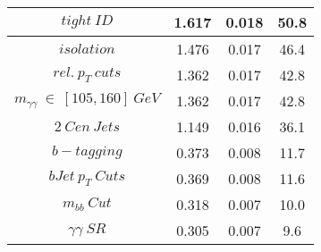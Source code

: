 \begin{table}
\begin{center}
\begin{tabular}{|c|c|c|c|}
 \hline
$tight\ ID$ & 1.617&0.018 &50.8 \\
 \hline
$isolation$ & 1.476&0.017 &46.4 \\
 \hline
$rel.\ p_{T}\ cuts$ & 1.362&0.017 &42.8 \\
 \hline
$m_{\gamma\gamma}\ \in\ [105,160]\ GeV$ & 1.362&0.017 &42.8 \\
 \hline
$2\ Cen\ Jets$ & 1.149&0.016 &36.1 \\
 \hline
$b-tagging$ & 0.373&0.008 &11.7 \\
 \hline
$bJet\ p_{T}\ Cuts$ & 0.369&0.008 &11.6 \\
 \hline
$m_{bb}\ Cut$ & 0.318&0.007 &10.0 \\
 \hline
$\gamma\gamma\ SR$ & 0.305&0.007 & 9.6 \\
 \hline
\end{tabular}
\end{center}
\end{table}
